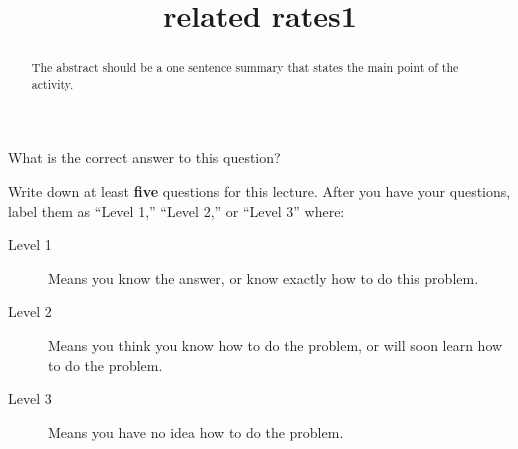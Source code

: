 \documentclass{ximera}
\title{related rates1}
\begin{document}
\begin{abstract}
  The abstract should be a one sentence summary that states the main point of the activity.
\end{abstract}

\maketitle

\begin{question}
  What is the correct answer to this question?

  
    \begin{multipleChoice}
    \end{multipleChoice}  
  
\end{question}

Write down at least \textbf{five} questions for this lecture. After
you have your questions, label them as ``Level 1,'' ``Level 2,'' or ``Level 3'' where:
\begin{description}
\item[Level 1] Means you know the answer, or know exactly how to do this problem.
\item[Level 2] Means you think you know how to do the problem, or will soon learn how to do the problem.
\item[Level 3] Means you have no idea how to do the problem. 
\end{description}
\begin{question}
  \begin{freeResponse}
  \end{freeResponse}
\end{question}
\end{document}
